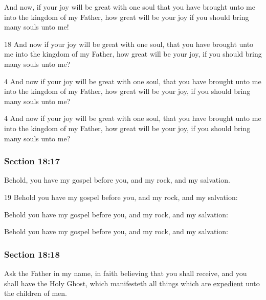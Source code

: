 		And now, if your joy will be great with one soul that you have brought unto me into the kingdom of my Father, how great will be your joy if you should bring many souls unto me!

		\begin{framed}
		\scriptsize
			\begin{compactdesc}
				\item[JSP] 18 And now if your joy will be great with one soul, that you have brought unto me into the kingdom of my Father, how great will be your joy, if you should bring many souls unto me?
				\item[DC 1835] 4 And now if your joy will be great with one soul, that you have brought unto me into the kingdom of my Father, how great will be your joy, if you should bring many souls unto me? 
				\item[DC 1844] 4 And now if your joy will be great with one soul, that you have brought unto me into the kingdom of my Father, how great will be your joy, if you should bring many souls unto me? 
			\end{compactdesc}
		\end{framed}

	\subsubsection{Section 18:17} %
		\label{DC18-17}

		Behold, you have my gospel before you, and my rock, and my salvation.

		\begin{framed}
		\scriptsize
			\begin{compactdesc}
				\item[JSP] 19 Behold you have my gospel before you, and my rock, and my salvation:
				\item[DC 1835] Behold you have my gospel before you, and my rock, and my salvation: 
				\item[DC 1844] Behold you have my gospel before you, and my rock, and my salvation: 
			\end{compactdesc}
		\end{framed}

	\subsubsection{Section 18:18} %
		\label{DC18-18}

		Ask the Father in my name, in faith believing that you shall receive, and you shall have the Holy Ghost, which manifesteth all things which are \hyperref[EXPEDIENT]{expedient} unto the children of men.

